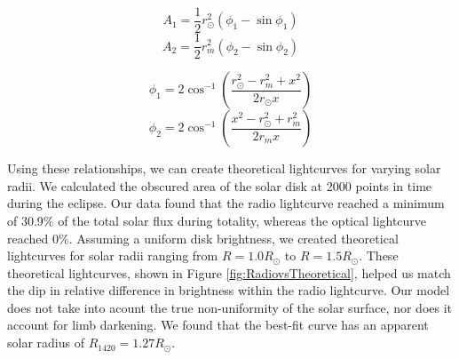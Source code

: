 \begin{equation}
  A_1 = \frac{1}{2}r_{\odot}^2\left(\phi_1 - \sin\phi_1\right)
\end{equation}
\begin{equation}
  A_2 = \frac{1}{2}r_{m}^2\left(\phi_2 - \sin\phi_2\right)
\end{equation}

\begin{equation}
  \phi_1 = 2\cos^{-1}\left(\frac{r_{\odot}^2 - r_{m}^2+x^2}{2r_{\odot}x}\right)
\end{equation}
\begin{equation}
  \phi_2 = 2\cos^{-1}\left(\frac{x^2 - r_{\odot}^2 + r_{m}^2}{2r_{m}x}\right)
\end{equation}

Using these relationships, we can create theoretical lightcurves for varying solar radii.
We calculated the obscured area of the solar disk at 2000 points in time during the eclipse.
Our data found that the radio lightcurve reached a minimum of 30.9\% of the total solar flux during totality, whereas the optical lightcurve reached 0\%.
Assuming a uniform disk brightness, we created theoretical lightcurves for solar radii ranging from $R = 1.0 R_{\odot}$ to $R = 1.5 R_{\odot}$.
These theoretical lightcurves, shown in Figure \ref{fig:RadiovsTheoretical}, helped us match the dip in relative difference in brightness within the radio lightcurve.
Our model does not take into acount the true non-uniformity of the solar surface, nor does it account for limb darkening.
We found that the best-fit curve has an apparent solar radius of $R_{\mathrm{1420}} = 1.27 R_{\odot}$.